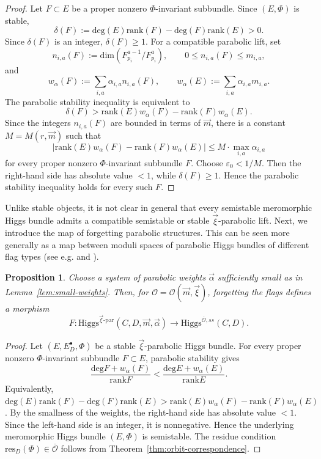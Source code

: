 \documentclass[11pt]{amsart}
\theoremstyle{plain}
\newtheorem{proposition}[theorem]{Proposition}
\theoremstyle{definition}
\theoremstyle{remark}
\newcommand{\rk}{\operatorname{rk}}
\newcommand{\ov}[1]{\overline{#1}}
\newcommand{\cO}{\mathcal O}
\newcommand{\Higgs}{\mathrm{Higgs}}
\def\deg{\textrm{deg}}
\def\rk{\textrm{rank}}
\def\dim{\mathrm{dim}}
\def\res{\mathrm{res}}
\begin{document}
\begin{proof}
Let $F\subset E$ be a proper nonzero $\Phi$-invariant subbundle. Since $(E,\Phi)$ is stable,
\[
\delta(F):=\deg(E)\rk(F)-\deg(F)\rk(E)>0.
\]
Since $\delta(F)$ is an integer, $\delta(F)\geq 1$. For a compatible parabolic lift, set
\[
n_{i,a}(F):=\dim(F_{p_i}^{a-1}/F_{p_i}^{a}),
\qquad
0\leq n_{i,a}(F)\leq m_{i,a},
\]
and
\[
w_{\alpha}(F):=\sum_{i,a}\alpha_{i,a}n_{i,a}(F),
\qquad
w_{\alpha}(E):=\sum_{i,a}\alpha_{i,a}m_{i,a}.
\]
The parabolic stability inequality is equivalent to
\[
\delta(F)>\rk(E)w_{\alpha}(F)-\rk(F)w_{\alpha}(E).
\]
Since the integers $n_{i,a}(F)$ are bounded in terms of $\vec m$, there is a constant $M=M(r,\vec m)$ such that
\[
\left|\rk(E)w_{\alpha}(F)-\rk(F)w_{\alpha}(E)\right|
\leq M\cdot \max_{i,a}\alpha_{i,a}
\]
for every proper nonzero $\Phi$-invariant subbundle $F$. Choose $\varepsilon_0<1/M$. Then the right-hand side has absolute value $<1$, while $\delta(F)\geq 1$. Hence the parabolic stability inequality holds for every such $F$.
\end{proof}

Unlike stable objects, it is not clear in general that every semistable meromorphic Higgs bundle admits a compatible semistable or stable $\vec\xi$-parabolic lift. Next, we introduce the map of forgetting parabolic structures. This can be seen more generally as a map between moduli spaces of parabolic Higgs bundles of different flag types (see e.g. \cite[Section 4]{logaresMartens} and  \cite[Section 3.5]{Shu2025DSP}).

\begin{proposition}\label{prop:well-defined-forgetful}
Choose a system of parabolic weights $\vec\alpha$ sufficiently small as in Lemma~\ref{lem:small-weights}. Then, for $\cO=\cO(\vec m,\vec\xi)$, forgetting the flags defines a morphism
\[
F:\Higgs^{\vec\xi\text{-par}}(C,D,\vec m,\vec\alpha)\longrightarrow \Higgs^{\ov\cO,ss}(C,D).
\]
\end{proposition}

\begin{proof}
Let $(E,E_D^\bullet,\Phi)$ be a stable $\vec\xi$-parabolic Higgs bundle. For every proper nonzero $\Phi$-invariant subbundle $F\subset E$, parabolic stability gives
\[
\frac{\deg F+w_{\alpha}(F)}{\rk F}
<
\frac{\deg E+w_{\alpha}(E)}{\rk E}.
\]
Equivalently, $
\deg(E)\rk(F)-\deg(F)\rk(E)>
\rk(E)w_{\alpha}(F)-\rk(F)w_{\alpha}(E)$. 
By the smallness of the weights, the right-hand side has absolute value $<1$. Since the left-hand side is an integer, it is nonnegative. Hence the underlying meromorphic Higgs bundle $(E,\Phi)$ is semistable. The residue condition $\res_{D}(\Phi) \in \ov\cO$ follows from Theorem~\ref{thm:orbit-correspondence}.
\end{proof}
\end{document}
